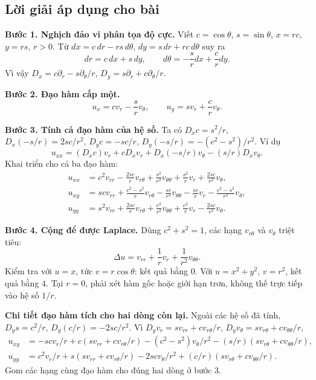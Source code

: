 \documentclass[10pt,a4paper]{article}
\begin{document}
\subsection*{Lời giải áp dụng cho bài}
\textbf{Bước 1. Nghịch đảo vi phân tọa độ cực.} Viết $c=\cos\theta$, $s=\sin\theta$, $x=rc$, $y=rs$, $r>0$. Từ $dx=c\,dr-rs\,d\theta$, $dy=s\,dr+rc\,d\theta$ suy ra
\[dr=c\,dx+s\,dy,\qquad d\theta=-\frac{s}{r}dx+\frac{c}{r}dy.\]
Vì vậy $D_x=c\partial_r-s\partial_\theta/r$, $D_y=s\partial_r+c\partial_\theta/r$.

\textbf{Bước 2. Đạo hàm cấp một.}
\[u_x=cv_r-\frac{s}{r}v_\theta,\qquad u_y=sv_r+\frac{c}{r}v_\theta.\]

\textbf{Bước 3. Tính cả đạo hàm của hệ số.} Ta có $D_xc=s^2/r$, $D_x(-s/r)=2sc/r^2$, $D_yc=-sc/r$, $D_y(-s/r)=-(c^2-s^2)/r^2$. Ví dụ
\[u_{xx}=(D_xc)v_r+cD_xv_r+D_x(-s/r)v_\theta-(s/r)D_xv_\theta.\]
Khai triển cho cả ba đạo hàm:
\begin{align*}
u_{xx}&=c^2v_{rr}-\frac{2sc}{r}v_{r\theta}+\frac{s^2}{r^2}v_{\theta\theta}
+\frac{s^2}{r}v_r+\frac{2sc}{r^2}v_\theta,\\
u_{xy}&=scv_{rr}+\frac{c^2-s^2}{r}v_{r\theta}-\frac{sc}{r^2}v_{\theta\theta}
-\frac{sc}{r}v_r-\frac{c^2-s^2}{r^2}v_\theta,\\
u_{yy}&=s^2v_{rr}+\frac{2sc}{r}v_{r\theta}+\frac{c^2}{r^2}v_{\theta\theta}
+\frac{c^2}{r}v_r-\frac{2sc}{r^2}v_\theta.
\end{align*}

\textbf{Bước 4. Cộng để được Laplace.} Dùng $c^2+s^2=1$, các hạng $v_{r\theta}$ và $v_\theta$ triệt tiêu:
\[\boxed{\Delta u=v_{rr}+\frac1r v_r+\frac1{r^2}v_{\theta\theta}.}\]
Kiểm tra với $u=x$, tức $v=r\cos\theta$: kết quả bằng $0$. Với $u=x^2+y^2$, $v=r^2$, kết quả bằng $4$. Tại $r=0$, phải xét hàm gốc hoặc giới hạn trơn, không thế trực tiếp vào hệ số $1/r$.

\textbf{Chi tiết đạo hàm tích cho hai dòng còn lại.} Ngoài các hệ số đã tính, $D_ys=c^2/r$, $D_y(c/r)=-2sc/r^2$. Vì $D_yv_r=sv_{rr}+cv_{r\theta}/r$, $D_yv_\theta=sv_{r\theta}+cv_{\theta\theta}/r$,
\[\begin{aligned}
u_{xy}&=-scv_r/r+c(sv_{rr}+cv_{r\theta}/r)
-(c^2-s^2)v_\theta/r^2-(s/r)(sv_{r\theta}+cv_{\theta\theta}/r),\\
u_{yy}&=c^2v_r/r+s(sv_{rr}+cv_{r\theta}/r)
-2scv_\theta/r^2+(c/r)(sv_{r\theta}+cv_{\theta\theta}/r).
\end{aligned}\]
Gom các hạng cùng đạo hàm cho đúng hai dòng ở bước 3.
\end{document}
